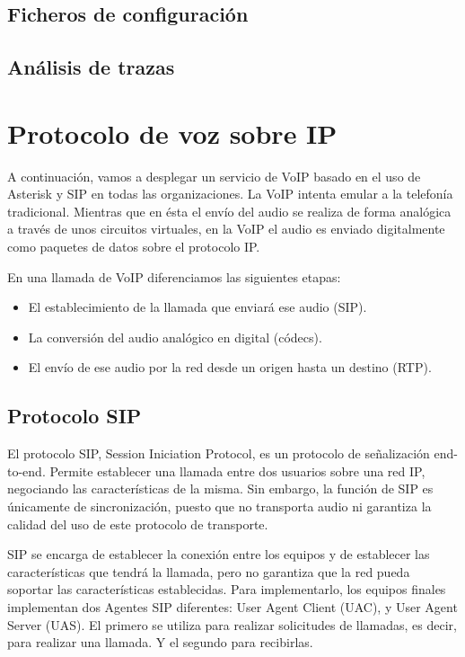 \documentclass[a4paper]{article}
\begin{document}
\subsection{Ficheros de configuración}
\subsection{Análisis de trazas}

\newpage
\section{Protocolo de voz sobre IP}

A continuación, vamos a desplegar un servicio de VoIP basado en el uso de Asterisk y SIP en todas las organizaciones.
La VoIP intenta emular a la telefonía tradicional. Mientras que en ésta el envío del audio se realiza de forma analógica a través de unos circuitos virtuales, en la VoIP el audio es enviado digitalmente como paquetes de datos sobre el protocolo IP.


 En una llamada de VoIP diferenciamos las siguientes etapas:
\begin{itemize}
    \item El establecimiento de la llamada que enviará ese audio (SIP).
    \item La conversión del audio analógico en digital (códecs).
    \item El envío de ese audio por la red desde un origen hasta un destino (RTP).

\end{itemize}

\subsection{Protocolo SIP}
El protocolo SIP, Session Iniciation Protocol, es un protocolo de señalización end-to-end. Permite establecer una llamada entre dos usuarios sobre una red IP, negociando las características de la misma. Sin embargo, la función de SIP es únicamente de sincronización, puesto que no transporta audio ni garantiza la calidad del uso de este protocolo de transporte. 


 SIP se encarga de establecer la conexión entre los equipos y de establecer las características que tendrá la llamada, pero no garantiza que la red pueda soportar las características establecidas.
Para implementarlo, los equipos finales implementan dos Agentes SIP diferentes: User Agent Client (UAC), y User Agent Server (UAS). El primero se utiliza para realizar solicitudes de llamadas, es decir, para realizar una llamada. Y el segundo para recibirlas.
\end{document}

